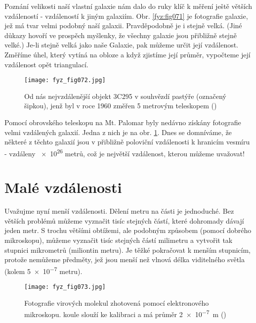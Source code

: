 {    Poznání velikosti naší vlastní galaxie nám dalo do ruky klíč k měření ještě větších vzdáleností 
    - vzdáleností k jiným galaxiím. Obr. \ref{fyz:fig071} je fotografie galaxie, jež má tvar velmi 
    podobný naší galaxii. Pravděpodobně je i stejně velká. (Jiné důkazy hovoří ve prospěch 
    myšlenky, že všechny galaxie jsou přibližně stejně velké.) Je-li stejně velká jako naše 
    Galaxie, pak můžeme určit její vzdálenost. Změříme úhel, který vytíná na obloze a když zjistíme 
    její průměr, vypočteme její vzdálenost opět triangulací.

    \begin{figure}[ht!]  %
      \centering
      \texttt{[image: fyz\_fig072.jpg]}
      \caption{Od nás nejvzdálenější objekt 3C295 v souhvězdí pastýře (označený šipkou), jenž byl v 
               roce \num{1960} změřen \num{5} metrovým teleskopem (\cite[s.~73]{Feynman01})}
      \label{fyz:fig072}
    \end{figure}
    
    Pomocí obrovského teleskopu na Mt. Palomar byly nedávno získány fotografie velmi vzdálených 
    galaxií. Jedna z nich je na obr. \ref{fyz:fig072}. Dnes se domníváme, že některé z těchto 
    galaxií jsou v přibližně poloviční vzdálenosti k hranicím vesmíru - vzdáleny \num{e26} metrů, 
    což je největší vzdálenost, kterou můžeme uvažovat!
    
  \section{Malé vzdálenosti}
    Uvažujme nyní menší vzdálenosti. Dělení metru na části je jednoduché. Bez větších problémů 
    můžeme vyznačit tisíc stejných částí, které dohromady dávají jeden metr. S trochu většími 
    obtížemi, ale podobným způsobem (pomocí dobrého mikroskopu), můžeme vyznačit tisíc stejných 
    částí milimetru a vytvořit tak stupnici mikrometrů (miliontin metru). Je těžké pokračovat k 
    menším stupnicím, protože nemůžeme  předměty, jež jsou menší než vlnová délka 
    viditelného světla (kolem \num{5e-7} metru).

    \begin{figure}[ht!]  %
      \centering
      \texttt{[image: fyz\_fig073.jpg]}
      \caption{Fotografie virových molekul zhotovená pomocí elektronového mikroskopu.  
               koule slouží ke kalibraci a má průměr \SI{2e-7}{\m}  (\cite[s.~74]{Feynman01})}
      \label{fyz:fig073}
    \end{figure}
    
}
